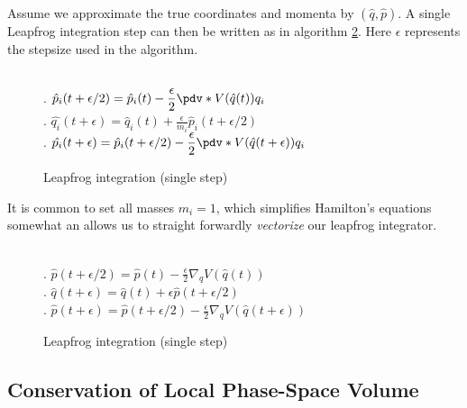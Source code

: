 Assume we approximate the true coordinates and momenta by $(\hat{q}, \hat{p})$. A single Leapfrog integration step can then be written as in algorithm \ref{algo:leapfrog}. 
Here $\epsilon$ represents the stepsize used in the algorithm.
\begin{figure}[H]
	\begin{algorithm}[H]
		\caption{Leapfrog integration (single step)}\label{algo:leapfrog}
		\begin{algorithmic}
       \\
			. $\hat{p}_i(t + \epsilon/2) = \hat{p}_i(t) - \displaystyle{\frac{\epsilon}{2}}\pdv*{V(\hat{q}(t))}{q_i} $\\
			. $\hat{q_i}(t+\epsilon) = \hat{q}_i(t) + \displaystyle{\frac{\epsilon}{m_i}} \hat{p}_i(t+\epsilon/2)$\\
			. $\hat{p_i}(t+\epsilon) = \hat{p}_i(t + \epsilon/2) -  \displaystyle{\frac{\epsilon}{2}}\pdv*{V(\hat{q}(t+\epsilon))}{q_i}$ \\
      \EndFor
      \EndProcedure
		\end{algorithmic}
	\end{algorithm}
\end{figure}
It is common to set all masses $m_i = 1$, which simplifies Hamilton's equations somewhat an allows us to straight forwardly \textit{vectorize} our
leapfrog integrator.
\begin{figure}[H]
	\begin{algorithm}[H]
		\caption{Leapfrog integration (single step)}\label{algo:leapfrog}
		\begin{algorithmic}
      \\
			. $\hat{p}(t + \epsilon/2) = \hat{p}(t) - \displaystyle{\frac{\epsilon}{2}}\nabla_q V(\hat{q}(t))$\\
			. $\hat{q}(t+\epsilon) = \hat{q}(t) + \epsilon \hat{p}(t+\epsilon/2)$\\
			. $\hat{p}(t+\epsilon) = \hat{p}(t + \epsilon/2) -  \displaystyle{\frac{\epsilon}{2}}\nabla_q V(\hat{q}(t+\epsilon))$
      \EndProcedure
		\end{algorithmic}
	\end{algorithm}
\end{figure}

\subsection{Conservation of Local Phase-Space Volume}

